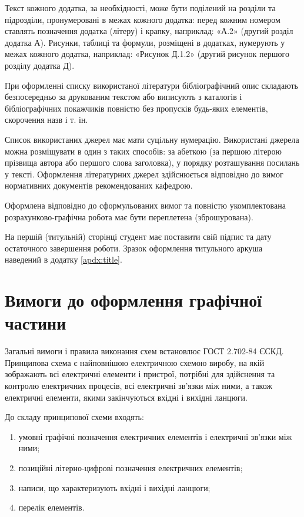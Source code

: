 Текст кожного додатка, за необхідності, може бути поділений на розділи та підрозділи, пронумеровані в межах кожного додатка: перед кожним номером ставлять позначення додатка (літеру) і крапку, нап\-рик\-лад: «А.2» (другий розділ додатка А). Рисунки, таблиці та формули, розміщені в додатках, нумерують у межах кожного додатка, наприклад: «Рисунок Д.1.2» (другий рисунок першого розділу додатка Д).

При оформленні списку використаної літератури бібліографічний опис складають безпосередньо за друкованим текстом або виписують з каталогів і бібліографічних покажчиків повністю без пропусків будь-яких елементів, скорочення назв і т. ін.

Список використаних джерел має мати суцільну нумерацію. Використані джерела можна розміщувати в один з таких способів: за абет\-кою (за першою літерою прізвища автора або першого слова заголовка), у порядку розташування посилань у тексті. Оформлення літературних джерел здійснюється відповідно до вимог нормативних документів рекомендованих кафедрою.

Оформлена відповідно до сформульованих вимог та повністю укомплектована розрахунково-графічна робота має бути переплетена (зброшурована).

На першій (титульній) сторінці студент має поставити свій підпис та дату остаточного завершення роботи. Зразок оформлення титульного аркуша наведений в додатку \ref{apdx:title}.


\section{Вимоги до оформлення графічної частини}

Загальні вимоги і правила виконання схем встановлює ГОСТ 2.702-84 ЄСКД. Принципова схема є найповнішою електричною схемою виробу, на якій зображають всі електричні елементи і пристрої, потрібні для здійснення та контролю електричних процесів, всі електричні зв’язки між ними, а також електричні елементи, якими закінчуються вхідні і вихідні ланцюги.

До складу принципової схеми входять:
\begin{enumerate}
\item умовні графічні позначення електричних елементів і електричні зв’язки між ними;
\item позиційні літерно-цифрові позначення електричних елементів;
\item написи, що характеризують вхідні і вихідні ланцюги;
\item перелік елементів.
\end{enumerate} 

